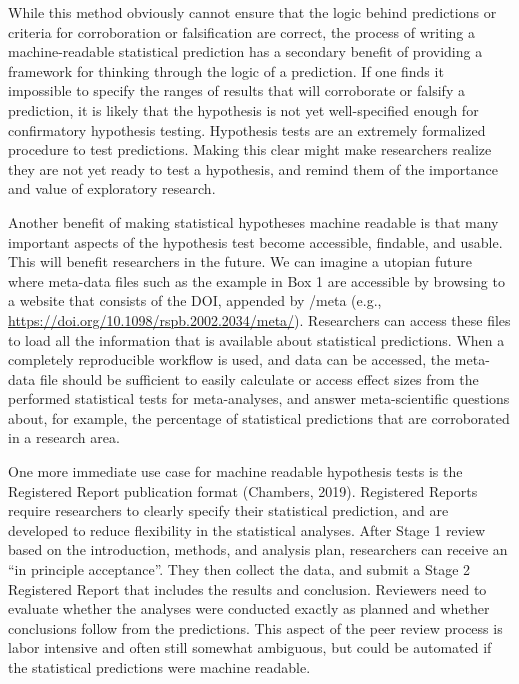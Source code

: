 \documentclass[doc,floatsintext]{apa6}
\begin{document}
While this method obviously cannot ensure that the logic behind predictions or criteria for corroboration or falsification are correct, the process of writing a machine-readable statistical prediction has a secondary benefit of providing a framework for thinking through the logic of a prediction. If one finds it impossible to specify the ranges of results that will corroborate or falsify a prediction, it is likely that the hypothesis is not yet well-specified enough for confirmatory hypothesis testing. Hypothesis tests are an extremely formalized procedure to test predictions. Making this clear might make researchers realize they are not yet ready to test a hypothesis, and remind them of the importance and value of exploratory research.

Another benefit of making statistical hypotheses machine readable is that many important aspects of the hypothesis test become accessible, findable, and usable. This will benefit researchers in the future. We can imagine a utopian future where meta-data files such as the example in Box 1 are accessible by browsing to a website that consists of the DOI, appended by /meta (e.g., \url{https://doi.org/10.1098/rspb.2002.2034/meta/}). Researchers can access these files to load all the information that is available about statistical predictions. When a completely reproducible workflow is used, and data can be accessed, the meta-data file should be sufficient to easily calculate or access effect sizes from the performed statistical tests for meta-analyses, and answer meta-scientific questions about, for example, the percentage of statistical predictions that are corroborated in a research area.

One more immediate use case for machine readable hypothesis tests is the Registered Report publication format (Chambers, 2019). Registered Reports require researchers to clearly specify their statistical prediction, and are developed to reduce flexibility in the statistical analyses. After Stage 1 review based on the introduction, methods, and analysis plan, researchers can receive an \enquote{in principle acceptance}. They then collect the data, and submit a Stage 2 Registered Report that includes the results and conclusion. Reviewers need to evaluate whether the analyses were conducted exactly as planned and whether conclusions follow from the predictions. This aspect of the peer review process is labor intensive and often still somewhat ambiguous, but could be automated if the statistical predictions were machine readable.
\end{document}
